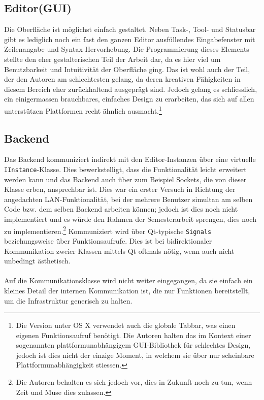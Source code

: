 \subsection{Editor(GUI)}
    Die Oberfläche ist möglichst einfach gestaltet. Neben Task-, Tool- und Statusbar gibt es lediglich noch ein fast den ganzen Editor ausfüllendes Eingabefenster mit 
    Zeilenangabe und Syntax-Hervorhebung. Die Programmierung dieses Elements stellte den eher gestalterischen Teil der Arbeit dar, da es hier viel um Benutzbarkeit und 
    Intuitivität der Oberfläche ging. Das ist wohl auch der Teil, der den Autoren am schlechtesten gelang, da deren kreativen Fähigkeiten in diesem Bereich eher zurückhaltend
    ausgeprägt sind. Jedoch gelang es schliesslich, ein einigermassen brauchbares, einfaches Design zu erarbeiten, das sich auf allen unterstützen Plattformen  recht ähnlich 
    ausmacht.\footnote{Die Version unter OS X verwendet auch die globale Tabbar, was einen eigenen Funktionsaufruf benötigt. Die Autoren halten das im Kontext einer sogenannten 
    plattformunabhängigem GUI-Bibliothek für schlechtes Design, jedoch ist dies nicht der einzige Moment, in welchem sie über nur scheinbare Plattformunabhängigkeit stiessen.}

\subsection{Backend}
    Das Backend kommuniziert indirekt mit den Editor-Instanzen über eine virtuelle \texttt{IInstance}-Klasse. Dies bewerkstelligt, dass die Funktionalität leicht erweitert werden 
    kann und das Backend auch über zum Beispiel Sockets, die von dieser Klasse erben, ansprechbar ist. Dies war ein erster Versuch in Richtung der angedachten LAN-Funktionalität,
    bei der mehrere Benutzer simultan am selben Code bzw. dem selben Backend arbeiten können; jedoch ist dies noch nicht implementiert und es würde den Rahmen der Semesterarbeit
    sprengen, dies noch zu implementieren.\footnote{Die Autoren behalten es sich jedoch vor, dies in Zukunft noch zu tun, wenn Zeit und Muse dies zulassen.} Kommuniziert wird über
    Qt-typische \texttt{Signals} beziehungsweise über Funktionsaufrufe. Dies ist bei bidirektionaler Kommunikation zweier Klassen mittels Qt oftmals nötig, wenn auch nicht unbedingt
    ästhetisch.
\paragraph{}
    Auf die Kommunikationsklasse wird nicht weiter eingegangen, da sie einfach ein kleines Detail der internen Kommunikation ist, die nur Funktionen bereitstellt, um die Infrastruktur
    generisch zu halten.

